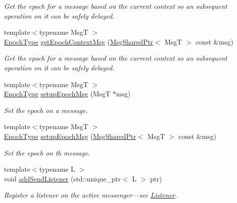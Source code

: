 \begin{DoxyCompactItemize}
\begin{DoxyCompactList}\small\item\em Get the epoch for a message based on the current context so an subsequent operation on it can be safely delayed. \end{DoxyCompactList}\item 
{\footnotesize template$<$typename MsgT $>$ }\\\hyperlink{namespacevt_a985a5adf291c34a3ca263b3378388236}{Epoch\+Type} \hyperlink{structvt_1_1messaging_1_1_active_messenger_a66c64223357aa92f45a4a4042bd63a5f}{get\+Epoch\+Context\+Msg} (\hyperlink{structvt_1_1messaging_1_1_msg_shared_ptr}{Msg\+Shared\+Ptr}$<$ MsgT $>$ const \&msg)
\begin{DoxyCompactList}\small\item\em Get the epoch for a message based on the current context so an subsequent operation on it can be safely delayed. \end{DoxyCompactList}\item 
{\footnotesize template$<$typename MsgT $>$ }\\\hyperlink{namespacevt_a985a5adf291c34a3ca263b3378388236}{Epoch\+Type} \hyperlink{structvt_1_1messaging_1_1_active_messenger_a7b5a8fc73617491423bf68c4fbe1e2a2}{setup\+Epoch\+Msg} (MsgT $\ast$msg)
\begin{DoxyCompactList}\small\item\em Set the epoch on a message. \end{DoxyCompactList}\item 
{\footnotesize template$<$typename MsgT $>$ }\\\hyperlink{namespacevt_a985a5adf291c34a3ca263b3378388236}{Epoch\+Type} \hyperlink{structvt_1_1messaging_1_1_active_messenger_ad7402f346c73b2a50ae1feb71140d891}{setup\+Epoch\+Msg} (\hyperlink{structvt_1_1messaging_1_1_msg_shared_ptr}{Msg\+Shared\+Ptr}$<$ MsgT $>$ const \&msg)
\begin{DoxyCompactList}\small\item\em Set the epoch on th message. \end{DoxyCompactList}\item 
{\footnotesize template$<$typename L $>$ }\\void \hyperlink{structvt_1_1messaging_1_1_active_messenger_a3083324696bb4f6e55164da2cb00a1c6}{add\+Send\+Listener} (std\+::unique\+\_\+ptr$<$ L $>$ ptr)
\begin{DoxyCompactList}\small\item\em Register a listener on the active messenger---see {\ttfamily \hyperlink{structvt_1_1messaging_1_1_listener}{Listener}}. \end{DoxyCompactList}\item 

\end{DoxyCompactItemize}
